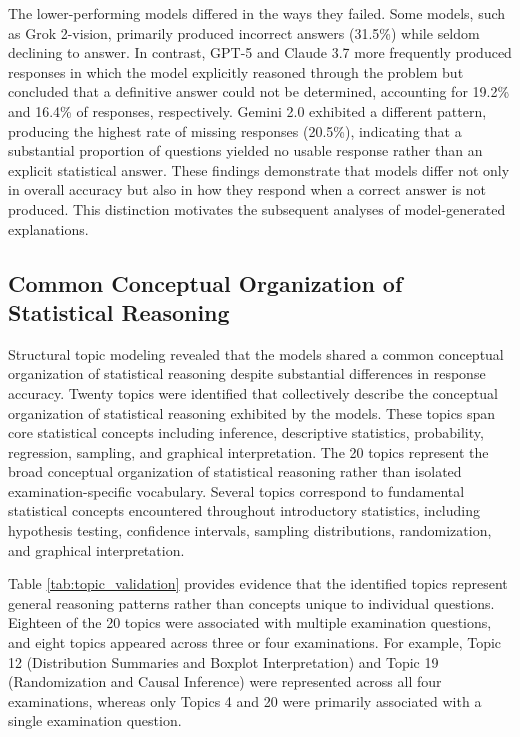 \documentclass[APA,LATO2COL]{WileyNJDv5}
\begin{document}
The lower-performing models differed in the ways they failed. Some models, such as Grok 2-vision, primarily produced incorrect answers (31.5\%) while seldom declining to answer. In contrast, GPT-5 and Claude 3.7 more frequently produced responses in which the model explicitly reasoned through the problem but concluded that a definitive answer could not be determined, accounting for 19.2\% and 16.4\% of responses, respectively. Gemini 2.0 exhibited a different pattern, producing the highest rate of missing responses (20.5\%), indicating that a substantial proportion of questions yielded no usable response rather than an explicit statistical answer. These findings demonstrate that models differ not only in overall accuracy but also in how they respond when a correct answer is not produced. This distinction motivates the subsequent analyses of model-generated explanations.


\subsection{Common Conceptual Organization of Statistical Reasoning}\label{sec:stmresults}

Structural topic modeling revealed that the models shared a common conceptual organization of statistical reasoning despite substantial differences in response accuracy. Twenty topics were identified that collectively describe the conceptual organization of statistical reasoning exhibited by the models. These topics span core statistical concepts including inference, descriptive statistics, probability, regression, sampling, and graphical interpretation. The 20 topics represent the broad conceptual organization of statistical reasoning rather than isolated examination-specific vocabulary. Several topics correspond to fundamental statistical concepts encountered throughout introductory statistics, including hypothesis testing, confidence intervals, sampling distributions, randomization, and graphical interpretation.

Table \ref{tab:topic_validation} provides evidence that the identified topics represent general reasoning patterns rather than concepts unique to individual questions. Eighteen of the 20 topics were associated with multiple examination questions, and eight topics appeared across three or four examinations. For example, Topic 12 (Distribution Summaries and Boxplot Interpretation) and Topic 19 (Randomization and Causal Inference) were represented across all four examinations, whereas only Topics 4 and 20 were primarily associated with a single examination question.
\end{document}
